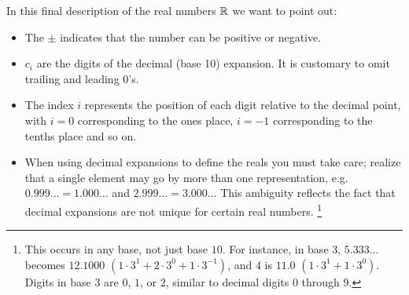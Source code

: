 \noindent In this final description of the real numbers ${\mathbb{R}}$ we want to point out:
\begin{itemize}
    \item The $\pm$ indicates that the number can be positive or negative.
    \item $c_i$ are the digits of the decimal (base 10) expansion. It is customary to omit trailing and leading $0$'s.
    \item The index $i$ represents the position of each digit relative to the decimal point, with $i=0$ corresponding to the ones place, $i=-1$ corresponding to the tenths place and so on.
    \item When using decimal expansions to define the reals you must take care; realize that a single element may go by more than one representation, e.g. $0.999 \ldots = 1.000 \ldots$ and $2.999 \ldots = 3.000 \ldots$ This ambiguity reflects the fact that decimal expansions are not unique for certain real numbers.
    \footnote{This occurs in any base, not just base $10$. For instance, in base $3$, $5.333\ldots$ becomes $12.1000$ $(1 \cdot 3^1 + 2 \cdot 3^0 + 1 \cdot 3^{-1})$, and $4$ is $11.0$ $(1 \cdot 3^1 + 1 \cdot 3^0)$. Digits in base $3$ are $0$, $1$, or $2$, similar to decimal digits $0$ through $9$. 
}
\end{itemize}
